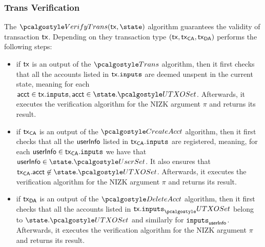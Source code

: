 \subsubsection{Trans Verification}
The $\vertxn(\txn, \state)$ algorithm guarantees the validity of transaction $\textup{\textsf{tx}}$. 
Depending on they transaction type $(\textup{\textsf{tx}}, \textup{\textsf{tx}}_\textsf{CA}, \textup{\textsf{tx}}_\textsf{DA})$ performs the following steps:
\begin{itemize}
    \item if $\textup{\textsf{tx}}$ is an output of the $\trans$ algorithm, then it first checks that all the accounts listed in $\textup{\textsf{tx}}.{\textup{\texttt{inputs}}}$ are deemed unspent in the current state, meaning for each $\acct \in \txn.\inputs, \acct \in \state.\utxoset$. Afterwards, it executes the verification algorithm for the NIZK argument $\pi$ and returns its result.
    \item if $\textup{\textsf{tx}}_\textsf{CA}$ is an output of the $\createAcct$ algorithm, then it first checks that all the $\textup{\textsf{userInfo}}$ listed in $\textup{\textsf{tx}}_\textsf{CA}.{\textup{\texttt{inputs}}}$ are registered, meaning, for each $\textup{\textsf{userInfo}} \in \textup{\textsf{tx}}_\textsf{CA}.{\textup{\texttt{inputs}}} $ we have that $\userinfo \in \state.\usersset$. It also ensures that $\txnca.\acct \not \in \state.\utxoset$. Afterwards, it executes the verification algorithm for the NIZK argument $\pi$ and returns its result.
    \item if $\textup{\textsf{tx}}_\textsf{DA}$ is an output of the $\deleteAcct$ algorithm, then it first checks that all the accounts listed in $\txn.\inputs_\utxoset$ belong to $\state.\utxoset$ and similarly for ${\textup{\texttt{inputs}}}_{\textup{\textsf{userInfo}}}$. Afterwards, it executes the verification algorithm for the NIZK argument $\pi$ and returns its result.
\end{itemize}
